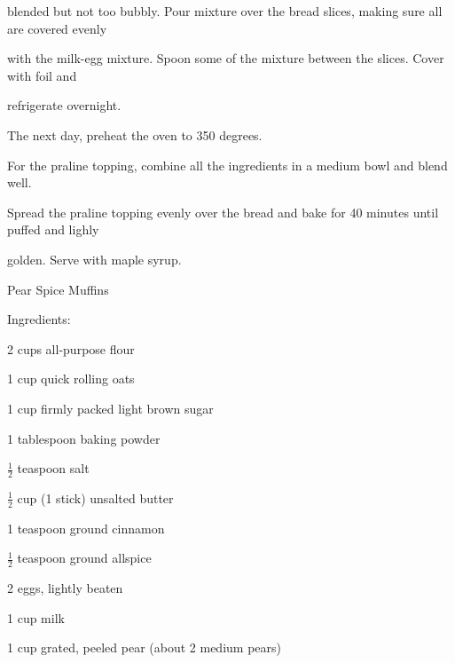 \documentclass[a4paper,portrait,12pt]{book}
\begin{document}
blended but not too bubbly. Pour mixture over the bread slices, making sure all are covered evenly




with the milk-egg mixture. Spoon some of the mixture between the slices. Cover with foil and




refrigerate overnight.




The next day, preheat the oven to 350 degrees.




For the praline topping, combine all the ingredients in a medium bowl and blend well.




Spread the praline topping evenly over the bread and bake for 40 minutes until puffed and lighly




golden. Serve with maple syrup.







\newpage
Pear Spice Muffins




Ingredients:




2 cups all-purpose flour




1 cup quick rolling oats




1 cup firmly packed light brown sugar




1 tablespoon baking powder




$\frac{1}{2}$ teaspoon salt




$\frac{1}{2}$ cup (1 stick) unsalted butter




1 teaspoon ground cinnamon




$\frac{1}{2}$ teaspoon ground allspice




2 eggs, lightly beaten




1 cup milk




1 cup grated, peeled pear (about 2 medium pears)
\end{document}
